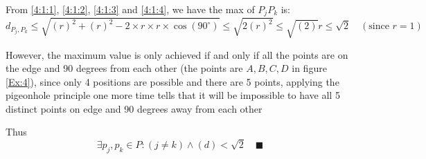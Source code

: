 \documentclass{article}
\renewcommand{\a}{\land}
\begin{document}
\begin{enumerate}[label=({\alph*})]
	From \eqref{4:1:1}, \eqref{4:1:2}, \eqref{4:1:3} and \eqref{4:1:4}, we have the max of \(P_jP_k\) is:
	\begin{equation}
		d_{P_j,P_k} \leq \sqrt{(r)^2 + (r)^2 - 2 \times r \times r\times \cos(90^\circ)} \leq \sqrt{2(r)^2} \leq \sqrt{(2)}r \leq \sqrt{2} \quad (\text{since }r = 1)
	\end{equation}

	However, the maximum value is only achieved if and only if all the points are on the edge and 90 degrees from each other (the points are \(A, B, C, D\) in figure \ref{Ex:4}), since only 4 positions are possible and there are 5 points, applying the pigeonhole principle one more time tells that it will be impossible to have all 5 distinct points on edge and 90 degrees away from each other

	Thus 
	\[\exists {p_j}, {p_k} \in P: (j \neq k) \a (d) < \sqrt{2}\quad\blacksquare\]
	
	
	\end{enumerate}
\end{document}
